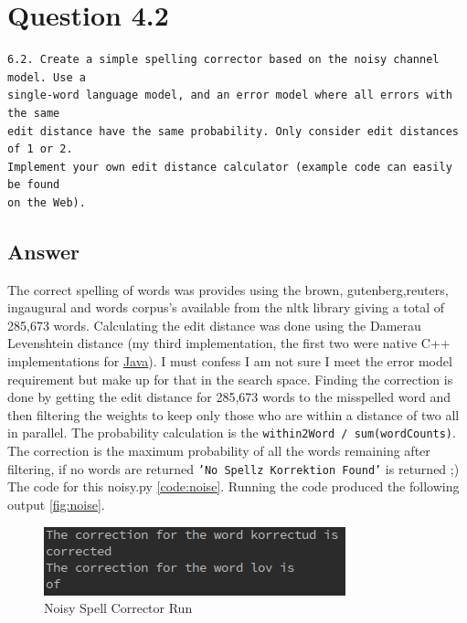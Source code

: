 \documentclass[11pt]{article}
\newenvironment{code}{\captionsetup{type=listing}}{}
\begin{document}
\begin{code}
\label{code:associations}
\end{code}
\newpage
\section{Question 4.2}
\begin{verbatim}
6.2. Create a simple spelling corrector based on the noisy channel model. Use a
single-word language model, and an error model where all errors with the same
edit distance have the same probability. Only consider edit distances of 1 or 2.
Implement your own edit distance calculator (example code can easily be found
on the Web).
\end{verbatim}
\subsection{Answer}
The correct spelling of words was provides using the brown, gutenberg,reuters, ingaugural and words corpus's available from the nltk library giving a total of 285,673 words. Calculating the edit distance was done using the Damerau Levenshtein distance (my third implementation, the first two were native C++ implementations for \href{https://github.com/N0taN3rd/Native-To-Java-StringUtils}{Java}). I must confess I am not sure I meet the error model requirement but make up for that in the search space. Finding the correction is done by getting the edit distance for 285,673 words to the misspelled word and then filtering the weights to keep only those who are within a distance of two all in parallel. The probability calculation is the \texttt{within2Word / sum(wordCounts)}. The correction is the maximum probability of all the words remaining after filtering, if no words are returned \texttt{'No Spellz Korrektion Found'} is returned ;) \newline The code for this noisy.py \autoref{code:noise}.
Running the code  produced the following output \autoref{fig:noise}.
\begin{figure}[H]
\centering
\includegraphics[scale=0.8]{noisy.png}
\caption{Noisy Spell Corrector Run}
\label{fig:noise}
\end{figure}
\begin{code}
\label{code:noise}
\end{code}
\newpage
\begin{code}
 \label{code:rg}
\end{code}
\end{document}

